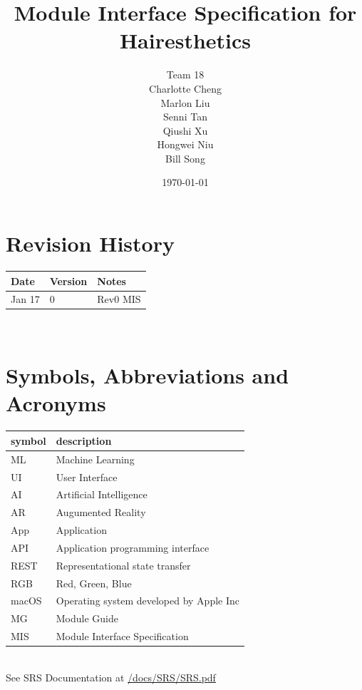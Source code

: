 \documentclass[12pt, titlepage]{article}
\begin{document}
\title{Module Interface Specification for Hairesthetics}

\author{Team 18 \\ Charlotte Cheng
        \\ Marlon Liu
        \\ Senni Tan
        \\ Qiushi Xu
        \\ Hongwei Niu
        \\ Bill Song
}

\date{\today}

\maketitle


\section{Revision History}

\begin{tabularx}{\textwidth}{p{3cm}p{2cm}X}
\toprule {\bf Date} & {\bf Version} & {\bf Notes}\\
\midrule
Jan 17 & 0 & Rev0 MIS\\
\bottomrule
\end{tabularx}

~\newpage

\section{Symbols, Abbreviations and Acronyms}
\begin{tabular}{l l} 
  \toprule		
  \textbf{symbol} & \textbf{description}\\
  \midrule 
  ML & Machine Learning \\
  UI & User Interface\\
  AI & Artificial Intelligence \\
  AR & Augumented Reality \\
  App & Application \\
  API & Application programming interface\\
  REST & Representational state transfer\\
  RGB & Red, Green, Blue \\
  macOS & Operating system developed by Apple Inc \\
  MG & Module Guide \\
  MIS & Module Interface Specification \\
  \bottomrule
\end{tabular}\\
\newline
See SRS Documentation at \href{https://github.com/marlon4dashen/Hairesthetics/blob/main/docs/SRS/SRS.pdf}{/docs/SRS/SRS.pdf}
\end{document}

